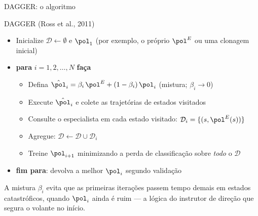 \documentclass[aspectratio=169, 11pt]{beamer}
\newcommand{\polE}{\pol^{E}}                     %
\newcommand{\Dset}{\mathcal{D}}
\begin{document}
\begin{frame}{DAGGER: o algoritmo}

  \begin{algbox}{DAGGER (Ross et al., 2011)}
    {\footnotesize
    \begin{itemize}\setlength{\itemsep}{0.15ex}
      \item Inicialize $\Dset \leftarrow \emptyset$ e $\pol_1$ (por exemplo, o
        próprio $\polE$ ou uma clonagem inicial)
      \item \textbf{para} $i = 1, 2, \dots, N$ \textbf{faça}
        \begin{itemize}\setlength{\itemsep}{0.1ex}
          \item Defina $\hat\pol_i = \beta_i\,\polE + (1-\beta_i)\,\pol_i$
            \hfill{\scriptsize(mistura; $\beta_i \to 0$)}
          \item Execute $\hat\pol_i$ e colete as trajetórias de estados visitados
          \item Consulte o especialista em cada estado visitado:
            $\Dset_i = \{(s, \polE(s))\}$
          \item Agregue: $\Dset \leftarrow \Dset \cup \Dset_i$
          \item Treine $\pol_{i+1}$ minimizando a perda de classificação sobre
            \emph{todo} o $\Dset$
        \end{itemize}
      \item \textbf{fim para}: devolva a melhor $\pol_i$ segundo validação
    \end{itemize}}
  \end{algbox}

  \begin{ideiabox}
    A mistura $\beta_i$ evita que as primeiras iterações passem tempo demais em
    estados catastróficos, quando $\pol_i$ ainda é ruim --- a lógica do
    instrutor de direção que segura o volante no início.
  \end{ideiabox}
\end{frame}
\end{document}
